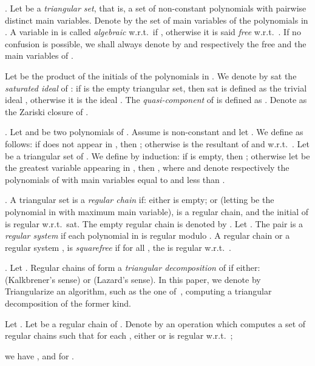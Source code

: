 \documentclass{sig-alternate}
\newcommand{\sat}[1]{\mbox{{\rm sat}}}
\newif\ifcomment
\begin{document}
\smallskip{}.
Let  be a {\em triangular set},
that is, a set of non-constant polynomials with pairwise
distinct main variables. 
Denote by  the set of
main variables of the polynomials in . 
A variable  in  is called
{\em algebraic} w.r.t.\  if , 
otherwise it is said {\em free} w.r.t.\ . 
If no confusion is possible, we shall always denote by
 and  
respectively the free and the main variables of .
\ifcomment{
For , denote by  the polynomial in 
with main variable .
For ,
we denote by  the set of 
polynomials  such that .
}\fi
Let  be the product
of the initials of the polynomials in .
We denote by \sat{T} the {\em saturated ideal} of : 
if  is the empty triangular set, then \sat{T} is defined as the trivial
ideal , otherwise it is the ideal
.
The {\em quasi-component}  of 
is defined as .
Denote  as the Zariski closure of .

\smallskip{}.
Let  and  be two polynomials of . 
Assume  is non-constant and let .
We define  as follows:
if  does not appear in , 
then ; otherwise 
is the resultant of  and  w.r.t.\ .
Let  be a triangular set of .
We define  by induction:
if  is empty, then ;
otherwise let  be the greatest variable appearing in , then 
, 
where  and  denote respectively the polynomials
of  with main variables equal to and less than .

\smallskip{}.
A triangular set  is a {\em regular chain} 
if: either  is empty; 
or (letting  be  the polynomial in  with maximum main variable),
  is a regular chain,
and the initial of  is regular w.r.t.\ 
\sat{T \setminus \{ t \}}.
The empty regular chain is denoted by .
Let .
The pair  is a {\em regular system} if each polynomial in 
is regular modulo . 
A regular chain  or a regular system , is {\em squarefree} 
if for all , the  is regular w.r.t.\ .


\smallskip{}.
Let . Regular chains  of 
form a {\em triangular decomposition} of  if either: 
 (Kalkbrener's sense) or 
 (Lazard's sense).
In this paper, we denote by {\sf Triangularize} an algorithm,
such as the one of~\cite{MMM99}, 
computing a triangular decomposition of the former kind.


\smallskip{}
Let .
Let  be a regular chain of .
Denote by  an operation which computes  
a set of regular chains  such that 
 for each , either  or  is
regular w.r.t.\ ; 
 
we have ,
 and  for .
\end{document}
